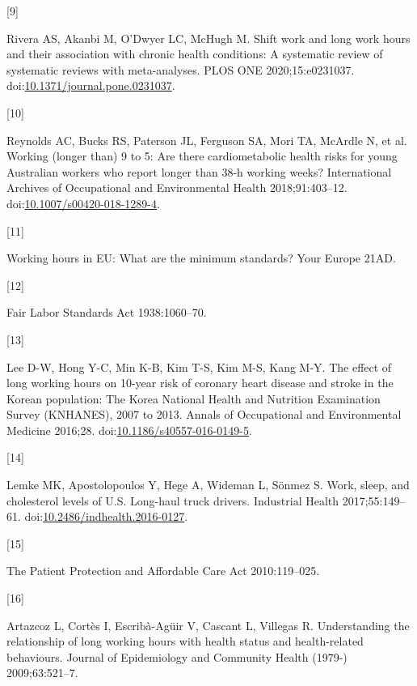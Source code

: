\documentclass[]{elsarticle} %
\newlength{\cslhangindent}
\newlength{\csllabelwidth}
\newenvironment{CSLReferences}[2] %
 {%
  \setlength{\parindent}{0pt}
  \ifodd #1 \everypar{\setlength{\hangindent}{\cslhangindent}}\ignorespaces\fi
  \ifnum #2 > 0
  \setlength{\parskip}{#2\baselineskip}
  \fi
 }%
 {}
\newcommand{\CSLLeftMargin}[1]{\parbox[t]{\csllabelwidth}{#1}}
\newcommand{\CSLRightInline}[1]{\parbox[t]{\linewidth - \csllabelwidth}{#1}\break}
\begin{document}
\begin{CSLReferences}{0}{0}
\leavevmode{}%
\CSLLeftMargin{{[}9{]} }
\CSLRightInline{Rivera AS, Akanbi M, O'Dwyer LC, McHugh M. Shift work
and long work hours and their association with chronic health
conditions: {A} systematic review of systematic reviews with
meta-analyses. PLOS ONE 2020;15:e0231037.
doi:\href{https://doi.org/10.1371/journal.pone.0231037}{10.1371/journal.pone.0231037}.}

\leavevmode{}%
\CSLLeftMargin{{[}10{]} }
\CSLRightInline{Reynolds AC, Bucks RS, Paterson JL, Ferguson SA, Mori
TA, McArdle N, et al. Working (longer than) 9 to 5: Are there
cardiometabolic health risks for young {Australian} workers who report
longer than 38-h working weeks? International Archives of Occupational
and Environmental Health 2018;91:403--12.
doi:\href{https://doi.org/10.1007/s00420-018-1289-4}{10.1007/s00420-018-1289-4}.}

\leavevmode{}%
\CSLLeftMargin{{[}11{]} }
\CSLRightInline{Working hours in {EU}: {What} are the minimum standards?
Your Europe 21AD.}

\leavevmode{}%
\CSLLeftMargin{{[}12{]} }
\CSLRightInline{Fair {Labor Standards Act} 1938:1060--70.}

\leavevmode{}%
\CSLLeftMargin{{[}13{]} }
\CSLRightInline{Lee D-W, Hong Y-C, Min K-B, Kim T-S, Kim M-S, Kang M-Y.
The effect of long working hours on 10-year risk of coronary heart
disease and stroke in the {Korean} population: The {Korea National
Health} and {Nutrition Examination Survey} ({KNHANES}), 2007 to 2013.
Annals of Occupational and Environmental Medicine 2016;28.
doi:\href{https://doi.org/10.1186/s40557-016-0149-5}{10.1186/s40557-016-0149-5}.}

\leavevmode{}%
\CSLLeftMargin{{[}14{]} }
\CSLRightInline{Lemke MK, Apostolopoulos Y, Hege A, Wideman L, Sönmez S.
Work, sleep, and cholesterol levels of {U}.{S}. Long-haul truck drivers.
Industrial Health 2017;55:149--61.
doi:\href{https://doi.org/10.2486/indhealth.2016-0127}{10.2486/indhealth.2016-0127}.}

\leavevmode{}%
\CSLLeftMargin{{[}15{]} }
\CSLRightInline{The {Patient Protection} and {Affordable Care Act}
2010:119--025.}

\leavevmode{}%
\CSLLeftMargin{{[}16{]} }
\CSLRightInline{Artazcoz L, Cortès I, Escribà-Agüir V, Cascant L,
Villegas R. Understanding the relationship of long working hours with
health status and health-related behaviours. Journal of Epidemiology and
Community Health (1979-) 2009;63:521--7.}


\end{CSLReferences}
\end{document}
